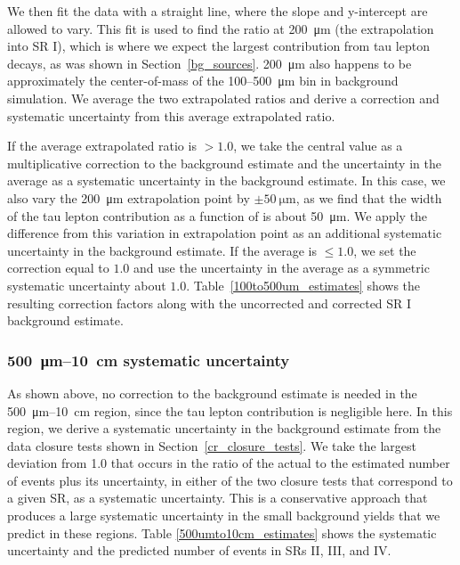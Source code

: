 We then fit the data with a straight line, where the slope and y-intercept are allowed to vary. This fit is used to find the ratio at \SI{200}{\um} (the extrapolation into SR I), which is where we expect the largest contribution from tau lepton decays, as was shown in Section~\ref{bg_sources}. \SI{200}{\um} also happens to be approximately the center-of-mass of the \num{100}--\SI{500}{\um} bin in background simulation. We average the two extrapolated ratios and derive a correction and systematic uncertainty from this average extrapolated ratio.



If the average extrapolated ratio is $>1.0$, we take the central value as a multiplicative correction to the background estimate and the uncertainty in the average as a systematic uncertainty in the background estimate. In this case, we also vary the \SI{200}{\um} extrapolation point by $\pm\SI{50}{\um}$, as we find that the width of the tau lepton contribution as a function of \ad is about \SI{50}{\um}. We apply the difference from this variation in extrapolation point as an additional systematic uncertainty in the background estimate. If the average is $\leq 1.0$, we set the correction equal to $1.0$ and use the uncertainty in the average as a symmetric systematic uncertainty about $1.0$. Table~\ref{100to500um_estimates} shows the resulting correction factors along with the uncorrected and corrected SR I background estimate.



\subsubsection{\SI{500}{\um}--\SI{10}{\cm} systematic uncertainty}
As shown above, no correction to the background estimate is needed in the \SI{500}{\um}--\SI{10}{\cm} region, since the tau lepton contribution is negligible here. In this region, we derive a systematic uncertainty in the background estimate from the data closure tests shown in Section~\ref{cr_closure_tests}. We take the largest deviation from \num{1.0} that occurs in the ratio of the actual to the estimated number of events plus its uncertainty, in either of the two closure tests that correspond to a given SR, as a systematic uncertainty. This is a conservative approach that produces a large systematic uncertainty in the small background yields that we predict in these regions. Table \ref{500umto10cm_estimates} shows the systematic uncertainty and the predicted number of events in SRs II, III, and IV.

